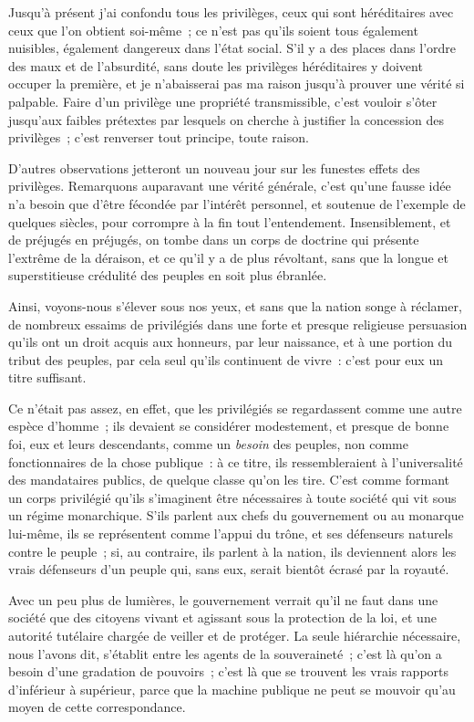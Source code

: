 \documentclass[french,twoside]{book} %
\begin{document}
Jusqu’à présent j’ai confondu tous les privilèges, ceux qui sont héréditaires avec ceux que l’on obtient soi-même ; ce n’est pas qu’ils soient tous également nuisibles, également dangereux dans l’état social. S’il y a des places dans l’ordre des maux et de l’absurdité, sans doute les privilèges héréditaires y doivent occuper la première, et je n’abaisserai pas ma raison jusqu’à prouver une vérité si palpable. Faire d’un privilège une propriété transmissible, c’est vouloir s’ôter jusqu’aux faibles prétextes par lesquels on cherche à justifier la concession des privilèges ; c’est renverser tout principe, toute raison.\par
D’autres observations jetteront un nouveau jour sur les funestes effets des privilèges. Remarquons auparavant une vérité générale, c’est qu’une fausse idée n’a besoin que d’être fécondée par l’intérêt personnel, et soutenue de l’exemple de quelques siècles, pour corrompre à la fin tout l’entendement. Insensiblement, et de préjugés en préjugés, on tombe dans un corps de doctrine qui présente l’extrême de la déraison, et ce qu’il y a de plus révoltant, sans que la longue et superstitieuse crédulité des peuples en soit plus ébranlée.\par
Ainsi, voyons-nous s’élever sous nos yeux, et sans que la nation songe à réclamer, de nombreux essaims de privilégiés dans une forte et presque religieuse persuasion qu’ils ont un droit acquis aux honneurs, par leur naissance, et à une portion du tribut des peuples, par cela seul qu’ils continuent de vivre : c’est pour eux un titre suffisant.\par
Ce n’était pas assez, en effet, que les privilégiés se regardassent comme une autre espèce d’homme ; ils devaient se considérer modestement, et presque de bonne foi, eux et leurs descendants, comme un {\itshape besoin} des peuples, non comme fonctionnaires de la chose publique : à ce titre, ils ressembleraient à l’universalité des mandataires publics, de quelque classe qu’on les tire. C’est comme formant un corps privilégié qu’ils s’imaginent être nécessaires à toute société qui vit sous un régime monarchique. S’ils parlent aux chefs du gouvernement ou au monarque lui-même, ils se représentent comme l’appui du trône, et ses défenseurs naturels contre le peuple ; si, au contraire, ils parlent à la nation, ils deviennent alors les vrais défenseurs d’un peuple qui, sans eux, serait bientôt écrasé par la royauté.\par
Avec un peu plus de lumières, le gouvernement verrait qu’il ne faut dans une société que des citoyens vivant et agissant sous la protection de la loi, et une autorité tutélaire chargée de veiller et de protéger. La seule hiérarchie nécessaire, nous l’avons dit, s’établit entre les agents de la souveraineté ; c’est là qu’on a besoin d’une gradation de pouvoirs ; c’est là que se trouvent les vrais rapports d’inférieur à supérieur, parce que la machine publique ne peut se mouvoir qu’au moyen de cette correspondance.\par
\end{document}
